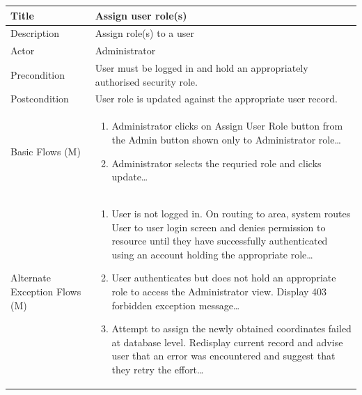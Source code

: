 \documentclass[a4paper,12pt]{article}
\newcommand\addrow[2]{#1 &#2\\ }
\newcommand\addheading[2]{#1 &#2\\ \hline}
\newcommand\tabularhead{\begin{tabular}{lp{8cm}}
\hline
}
\newcommand\addmulrow[2]{ \begin{minipage}[t][][t]{2.5cm}#1\end{minipage}%
   &\begin{minipage}[t][][t]{8cm}
    \begin{enumerate} #2   \end{enumerate}
    \end{minipage}\\ }
\newenvironment{usecase}{\tabularhead}
{\hline\end{tabular}}
\begin{document}
\begin{samepage}
\begin{usecase}
    \addheading{Title}{Assign user role(s) }
  \addheading{Description}{Assign role(s) to a user}
  \addheading{Actor}{Administrator} 
  \addrow{Precondition}{User must be logged in and hold an appropriately authorised security role.}
  \addrow{Postcondition}{User role is updated against the appropriate user record.}
  \addmulrow{Basic Flows (M)}{\item Administrator clicks on Assign User Role button from the Admin button shown only to Administrator role\ldots
  \newpage
  \item Administrator selects the requried role and clicks update\ldots}
  \addmulrow{Alternate Exception Flows (M)}{\item User is not logged in. On routing to area, system routes User to user login screen and denies permission to resource until they have successfully authenticated using an account holding the appropriate role\ldots
                                                                      \item User authenticates but does not hold an appropriate role to access the Administrator  view. Display 403 forbidden exception message\ldots
                                                                      \item Attempt to assign the newly obtained coordinates failed at database level. Redisplay current record and advise user that an error was encountered and suggest that they retry the effort\ldots}
\end{usecase}


\end{samepage}
\end{document}
